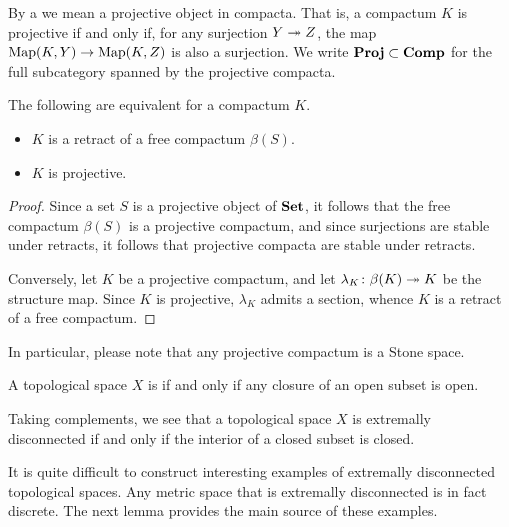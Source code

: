 \begin{dfn}
	By a  we mean a projective object in compacta.
	That is, a compactum $ K $ is projective if and only if, for any surjection $ Y \twoheadrightarrow Z $, the map $ \operatorname{Map}(K, Y) \to \operatorname{Map}(K, Z) $ is also a surjection.
	We write $ \textbf{\textup{Proj}} \subset \textbf{\textup{Comp}} $ for the full subcategory spanned by the projective compacta.
\end{dfn}

\begin{lem}
	The following are equivalent for a compactum $ K $.
	\begin{itemize}
		\item $ K $ is a retract of a free compactum $ \beta(S) $.
		\item $ K $ is projective.
	\end{itemize}
\end{lem}

\begin{proof}
	Since a set $ S $ is a projective object of $ \textbf{\textup{Set}} $, it follows that the free compactum $ \beta(S) $ is a projective compactum,
	and since surjections are stable under retracts, it follows that projective compacta are stable under retracts.

	Conversely, let $ K $ be a projective compactum, and let $ \lambda_K \colon \beta(K) \twoheadrightarrow K $ be the structure map.
	Since $ K $ is projective, $ \lambda_K $ admits a section, whence $ K $ is a retract of a free compactum.
\end{proof}

\begin{nul}
	In particular, please note that any projective compactum is a Stone space.
\end{nul}

\begin{dfn}
	A topological space $ X $ is  if and only if any closure of an open subset is open.
\end{dfn}

\begin{nul}
	Taking complements, we see that a topological space $ X $ is extremally disconnected if and only if the interior of a closed subset is closed.
\end{nul}

\begin{nul}
	It is quite difficult to construct interesting examples of extremally disconnected topological spaces.
	Any metric space that is extremally disconnected is in fact discrete.
	The next lemma provides the main source of these examples.
\end{nul}

